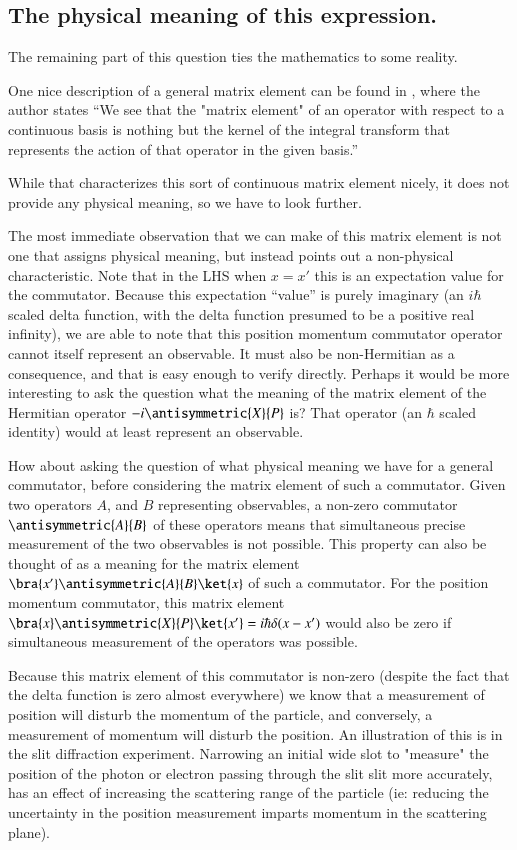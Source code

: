 \subsection{The physical meaning of this expression.}

The remaining part of this question ties the mathematics to some reality.

One nice description of a general matrix element can be found in \citep{ bohrBerkleyPhy221}, where the author states ``We see that the "matrix element" of an operator with respect to a continuous basis is nothing but the kernel of the integral transform that represents the action of that operator in the given basis.''

While that characterizes this sort of continuous matrix element nicely, it does not provide any physical meaning, so we have to look further.

The most immediate observation that we can make of this matrix element is not one that assigns physical meaning, but instead points out a non-physical characteristic.  Note that in the LHS when $x=x'$ this is an expectation value for the commutator.  Because this expectation ``value'' is purely imaginary (an $i\hbar$ scaled delta function, with the delta function presumed to be a positive real infinity), we are able to note that this position momentum commutator operator cannot itself represent an observable.  It must also be non-Hermitian as a consequence, and that is easy enough to verify directly.  Perhaps it would be more interesting to ask the question what the meaning of the matrix element of the Hermitian operator $-i \antisymmetric{X}{P}$ is?  That operator (an $\hbar$ scaled identity) would at least represent an observable.

How about asking the question of what physical meaning we have for a general commutator, before considering the matrix element of such a commutator.  Given two operators $A$, and $B$ representing observables, a non-zero commutator $\antisymmetric{A}{B}$ of these operators means that simultaneous precise measurement of the two observables is not possible.  This property can also be thought of as a meaning for the matrix element $\bra{x'}\antisymmetric{A}{B} \ket{x}$ of such a commutator.  For the position momentum commutator, this matrix element $\bra{x} \antisymmetric{X}{P} \ket{x'} = i \hbar \delta(x-x')$ would also be zero if simultaneous measurement of the operators was possible.

Because this matrix element of this commutator is non-zero (despite the fact that the delta function is zero almost everywhere) we know that a measurement of position will disturb the momentum of the particle, and conversely, a measurement of momentum will disturb the position.  An illustration of this is in the slit diffraction experiment.  Narrowing an initial wide slot to "measure" the position of the photon or electron passing through the slit slit more accurately, has an effect of increasing the scattering range of the particle (ie: reducing the uncertainty in the position measurement imparts momentum in the scattering plane).

